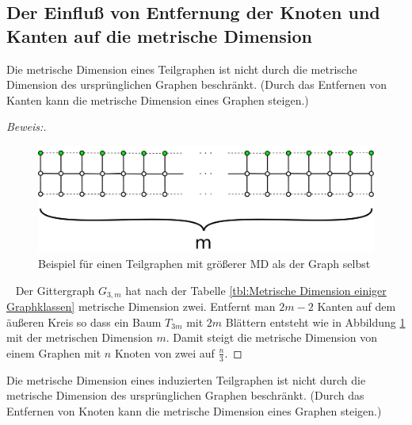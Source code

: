 \subsection{Der Einfluß von Entfernung der Knoten und Kanten auf die metrische Dimension}
\begin{lem}
Die metrische Dimension eines Teilgraphen ist nicht durch die metrische Dimension des ursprünglichen Graphen beschränkt. (Durch das Entfernen von Kanten kann die metrische Dimension eines Graphen steigen.)
\end{lem}
\begin{proof}[Beweis:]$\;$
\begin{figure}[h!]
		\centering 		 
\includegraphics[width=420pt]{bilder/gitterzubaum.pdf}
   \caption{Beispiel für einen Teilgraphen mit größerer MD als der Graph selbst}
   \label{bild:Gitterbaum1}
\end{figure}
~ \linebreak
Der Gittergraph $G_{3,m}$ hat nach der Tabelle \ref{tbl:Metrische Dimension einiger Graphklassen} metrische Dimension zwei. Entfernt man $2m-2$ Kanten auf dem äußeren Kreis so dass ein Baum $T_{3m}$ mit $2m$ Blättern entsteht wie in Abbildung \ref{bild:Gitterbaum1} mit der metrischen Dimension $m$. Damit steigt die metrische Dimension von einem Graphen mit $n$ Knoten von zwei auf $\frac{n}{3}$.
\end{proof}
\begin{lem}
Die metrische Dimension eines induzierten Teilgraphen ist nicht durch die metrische Dimension des ursprünglichen Graphen beschränkt. (Durch das Entfernen von Knoten kann die metrische Dimension eines Graphen steigen.)
\end{lem}
